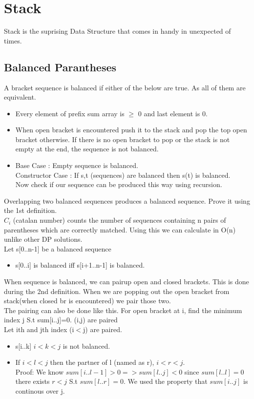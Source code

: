 \documentclass[../Notes.tex]{subfiles}
\begin{document}
\chapter{Stack}
Stack is the suprising Data Structure that comes in handy in unexpected of times.

\section{Balanced Parantheses}
A bracket sequence is balanced if either of the below are true. As all of them are equivalent.

\begin{itemize}
  \item Every element of prefix sum array is $\geq$ 0 and last element is 0.
  \item When open bracket is encountered push it to the stack and pop the top open bracket otherwise. If there is no open bracket to pop or the stack is not empty at the end, the sequence is not balanced.
  \item Base Case : Empty sequence is balanced.\\
  Constructor Case : If s,t (sequences) are balanced then s(t) is balanced.\\
  Now check if our sequence can be produced this way using recursion. 
\end{itemize}

Overlapping two balanced sequences produces a balanced sequence. Prove it using the 1st definition. \\

$C_{i}$ (catalan number) counts the number of sequences containing n pairs of parentheses which are correctly matched. Using this we can calculate in O(n) unlike other DP solutions.\\

Let s[0..n-1] be a balanced sequence
\begin{itemize}
	\item s[0..i] is balanced iff s[i+1..n-1] is balanced.	
\end{itemize}

\pagebreak

When sequence is balanced, we can pairup open and closed brackets. This is done during the 2nd definition. When we are popping out the open bracket from stack(when closed br is encountered) we pair those two.\\

The pairing can also be done like this. For open bracket at i, find the minimum index j S.t sum[i..j]=0. (i,j) are paired\\

Let ith and jth index (i$<$j) are paired.
\begin{itemize}
	\item s[i..k] $i<k<j$ is not balanced.
	\item If $i<l<j$ then the partner of l (named as r), $i<r<j$. \\
	Proof: We know $sum[i..l-1]>0 => sum[l..j]<0$ since $sum[l..l] = 0$ there exists $r<j$ S.t $sum[l..r]=0$. We used the property that $sum[i..j]$ is continous over j.
\end{itemize} 
\end{document}
